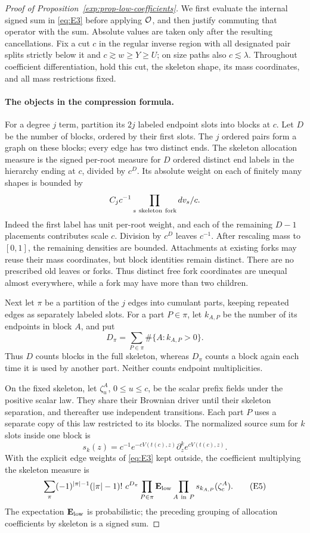 \begin{proof}[Proof of Proposition~\ref{exp:prop-low-coefficients}]
We first evaluate the internal signed sum in \eqref{eq:E3} before
applying \({\cal O}\), and then justify commuting that operator with
the sum. Absolute values are taken only after the resulting
cancellations. Fix a cut \(c\) in the regular inverse region with
all designated pair splits strictly below it and
\(c\gtrsim w\ge Y\ge U\); on size paths also \(c\lesssim\lambda\).
Throughout coefficient differentiation, hold this cut, the skeleton
shape, its mass coordinates, and all mass restrictions fixed.

\paragraph{The objects in the compression formula.}
For a degree \(j\) term, partition its \(2j\) labeled endpoint slots
into blocks at \(c\). Let \(D\) be the number of blocks, ordered by
their first slots. The \(j\) ordered pairs form a graph on these
blocks; every edge has two distinct ends. The skeleton allocation
measure is the signed per-root measure for \(D\) ordered distinct end
labels in the hierarchy ending at \(c\), divided by \(c^D\).
Its absolute weight on each of finitely many shapes is bounded by
\[
 C_jc^{-1}\prod_{s\ {\rm skeleton\ fork}}dv_s/c.
\]
Indeed the first label has unit per-root weight, and each of the
remaining \(D-1\) placements contributes scale \(c\). Division by
\(c^D\) leaves \(c^{-1}\). After rescaling mass to \([0,1]\), the
remaining densities are bounded. Attachments at existing forks may
reuse their mass coordinates, but block identities remain distinct.
There are no prescribed old leaves or forks. Thus distinct free fork
coordinates are unequal almost everywhere, while a fork may have
more than two children.

Next let \(\pi\) be a partition of the \(j\) edges into cumulant
parts, keeping repeated edges as separately labeled slots. For a
part \(P\in\pi\), let \(k_{A,P}\) be the number of its endpoints in
block \(A\), and put
\[
 D_\pi=\sum_{P\in\pi}\#\{A:k_{A,P}>0\}.
\]
Thus \(D\) counts blocks in the full skeleton, whereas \(D_\pi\)
counts a block again each time it is used by another part. Neither
counts endpoint multiplicities.

On the fixed skeleton, let \(\zeta^A_u\), \(0\le u\le c\), be the
scalar prefix fields under the positive scalar law. They share their
Brownian driver until their skeleton separation, and thereafter use
independent transitions. Each part \(P\) uses a separate copy of this
law restricted to its blocks. The normalized source sum for \(k\)
slots inside one block is
\[
 s_k(z)=c^{-1}e^{-cV(t(c),z)}\partial_z^k e^{cV(t(c),z)}.
\]
With the explicit edge weights of \eqref{eq:E3} kept outside, the
coefficient multiplying the skeleton measure is
\[
 \sum_{\pi}(-1)^{|\pi|-1}(|\pi|-1)!\ c^{D_\pi}
       \prod_{P\in\pi}\mathbf E_{\rm low}
           \prod_{A\ {\rm in}\ P} s_{k_{A,P}}(\zeta^A_c).
                                                               \tag{E5}\label{eq:E5}
\]
The expectation \(\mathbf E_{\rm low}\) is probabilistic; the preceding
grouping of allocation coefficients by skeleton is a signed sum.


\end{proof}
